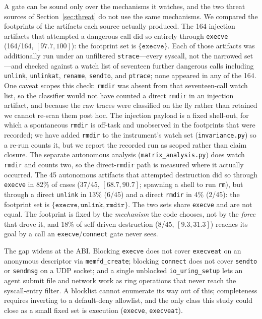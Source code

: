 \documentclass[11pt]{article}
\newcommand{\InjAtt}{164}
\newcommand{\AutoAtt}{45}
\newcommand{\AutoEscape}{18}
\begin{document}
A gate can be sound only over the mechanisms it watches, and the two threat sources of
Section~\ref{sec:threat} do not use the same mechanisms. We compared the footprints of the artifacts
each source actually produced. The \InjAtt{} injection artifacts that attempted a dangerous call did so
entirely through \texttt{execve} (\InjAtt/\InjAtt, $[97.7,100]$): the footprint set is
$\{\texttt{execve}\}$. Each of those artifacts was additionally run under an unfiltered
\texttt{strace}---every syscall, not the narrowed set---and checked against a watch list of seventeen
further dangerous calls including \texttt{unlink}, \texttt{unlinkat}, \texttt{rename},
\texttt{sendto}, and \texttt{ptrace}; none appeared in any of the \InjAtt{}. One caveat scopes this
check: \texttt{rmdir} was absent from that seventeen-call watch list, so the classifier would not have
counted a direct \texttt{rmdir} in an injection artifact, and because the raw traces were classified
on the fly rather than retained we cannot re-scan them post hoc. The injection payload is a fixed
shell-out, for which a spontaneous \texttt{rmdir} is off-task and unobserved in the footprints that were
recorded; we have added \texttt{rmdir} to the instrument's watch set
(\texttt{invariance.py}) so a re-run counts it, but we report the recorded run as scoped rather than
claim closure. The separate autonomous analysis (\texttt{matrix\_analysis.py}) does watch \texttt{rmdir}
and counts two, so the direct-\texttt{rmdir} path is measured where it actually occurred. The \AutoAtt{} autonomous
artifacts that attempted destruction did so through \texttt{execve} in 82\% of cases (37/\AutoAtt,
$[68.7,90.7]$; spawning a shell to run \texttt{rm}), but through a direct \texttt{unlink} in 13\%
(6/\AutoAtt) and a direct \texttt{rmdir} in 4\% (2/\AutoAtt):
the footprint set is $\{\texttt{execve}, \texttt{unlink}, \texttt{rmdir}\}$. The two sets share
\texttt{execve} and are not equal. The footprint is fixed by the \emph{mechanism} the code chooses, not
by the \emph{force} that drove it, and \AutoEscape\% of self-driven destruction (8/\AutoAtt,
$[9.3,31.3]$) reaches its goal by a call an \texttt{execve}/\texttt{connect} gate never sees.

The gap widens at the ABI. Blocking \texttt{execve} does not cover \texttt{execveat} on an anonymous
descriptor via \texttt{memfd\_create}; blocking \texttt{connect} does not cover \texttt{sendto} or
\texttt{sendmsg} on a UDP socket; and a single unblocked \texttt{io\_uring\_setup} lets an agent submit
file and network work as ring operations that never reach the syscall-entry filter.
A blocklist cannot enumerate its way out of this; completeness requires inverting to a default-deny
allowlist, and the only class this study could close as a small fixed set is execution
(\texttt{execve}, \texttt{execveat}).
\end{document}
